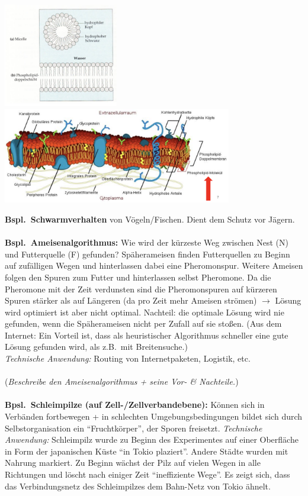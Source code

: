 \begin{center}
    \includegraphics[width=5cm]{lec6/figures/phospholipid.png}
    \hfill
    \includegraphics[width=10cm]{lec6/figures/zellwand.png}
\end{center}
\textbf{Bspl.\ Schwarmverhalten} von Vögeln/Fischen. Dient dem Schutz vor Jägern.
\\\\
\textbf{Bspl.\ Ameisenalgorithmus:} Wie wird der kürzeste Weg zwischen Nest (N) und Futterquelle (F) gefunden? Späherameisen finden Futterquellen zu Beginn auf zufälligen Wegen und hinterlassen dabei eine Pheromonspur. Weitere Ameisen folgen den Spuren zum Futter und hinterlassen selbst Pheromone. Da die Pheromone mit der Zeit verdunsten sind die Pheromonspuren auf kürzeren Spuren stärker als auf Längeren (da pro Zeit mehr Ameisen strömen) $\rightarrow$ Lösung wird optimiert ist aber nicht optimal. Nachteil: die optimale Lösung wird nie gefunden, wenn die Späherameisen nicht per Zufall auf sie stoßen. (Aus dem Internet: Ein Vorteil ist, dass als heuristischer Algorithmus schneller eine gute Lösung gefunden wird, als z.B.\ mit Breitensuche.)\\
\textit{Technische Anwendung:} Routing von Internetpaketen, Logistik, etc.
\\\\
(\dangersign \textit{Beschreibe den Ameisenalgorithmus + seine Vor- \& Nachteile.})
\\\\
\textbf{Bpsl.\ Schleimpilze (auf Zell-/Zellverbandebene):} Können sich in Verbänden fortbewegen + in schlechten Umgebungsbedingungen bildet sich durch Selbstorganisation ein ``Fruchtkörper'', der Sporen freisetzt. \textit{Technische Anwendung:} Schleimpilz wurde zu Beginn des Experimentes auf einer Oberfläche in Form der japanischen Küste ``in Tokio plaziert''. Andere Städte wurden mit Nahrung markiert. Zu Beginn wächst der Pilz auf vielen Wegen in alle Richtungen und löscht nach einiger Zeit ``ineffiziente Wege''. Es zeigt sich, dass das Verbindungsnetz des Schleimpilzes dem Bahn-Netz von Tokio ähnelt.
